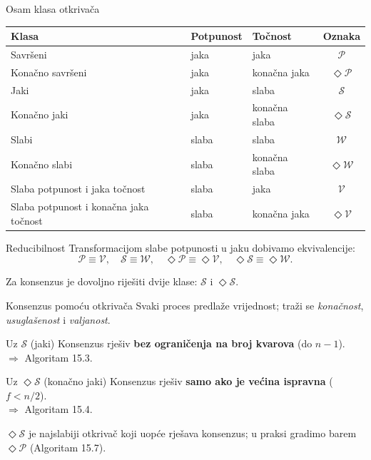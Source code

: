 \documentclass[aspectratio=169,11pt]{beamer}
\newcommand{\Dp}{\ensuremath{\mathcal{P}}}
\newcommand{\Ds}{\ensuremath{\mathcal{S}}}
\newcommand{\Dw}{\ensuremath{\mathcal{W}}}
\newcommand{\Dv}{\ensuremath{\mathcal{V}}}
\newcommand{\eP}{\ensuremath{\Diamond\mathcal{P}}}
\newcommand{\eS}{\ensuremath{\Diamond\mathcal{S}}}
\newcommand{\eW}{\ensuremath{\Diamond\mathcal{W}}}
\newcommand{\eV}{\ensuremath{\Diamond\mathcal{V}}}
\begin{document}
\begin{frame}{Osam klasa otkrivača}
  \centering
  \small
  \begin{tabular}{lllc}
    \toprule
    Klasa & Potpunost & Točnost & Oznaka \\
    \midrule
    Savršeni             & jaka  & jaka          & \Dp \\
    Konačno savršeni     & jaka  & konačna jaka  & \eP \\
    Jaki                 & jaka  & slaba         & \Ds \\
    Konačno jaki         & jaka  & konačna slaba & \eS \\
    Slabi                & slaba & slaba         & \Dw \\
    Konačno slabi        & slaba & konačna slaba & \eW \\
    Slaba potpunost i jaka točnost                  & slaba & jaka          & \Dv \\
    Slaba potpunost i konačna jaka točnost                  & slaba & konačna jaka  & \eV \\
    \bottomrule
  \end{tabular}
\end{frame}

\begin{frame}{Reducibilnost}
  Transformacijom slabe potpunosti u jaku dobivamo ekvivalencije:
  \[
    \Dp \equiv \Dv,\quad \Ds \equiv \Dw,\quad \eP \equiv \eV,\quad \eS \equiv \eW.
  \]
  \vfill
  \centering
  \vfill
  \footnotesize Za konsenzus je dovoljno riješiti dvije klase: \Ds{} i \eS.
\end{frame}

\begin{frame}{Konsenzus pomoću otkrivača}
  Svaki proces predlaže vrijednost; traži se \emph{konačnost}, \emph{usuglašenost}
  i \emph{valjanost}.
  \vfill
  \begin{block}{Uz \Ds{} (jaki)}
    Konsenzus rješiv \textbf{bez ograničenja na broj kvarova} (do $n-1$). \\
    $\Rightarrow$ Algoritam 15.3.
  \end{block}
  \begin{block}{Uz \eS{} (konačno jaki)}
    Konsenzus rješiv \textbf{samo ako je većina ispravna} ($f < n/2$). \\
    $\Rightarrow$ Algoritam 15.4.
  \end{block}
  \vfill
  \footnotesize \eS{} je najslabiji otkrivač koji uopće rješava konsenzus; u praksi
  gradimo barem \eP{} (Algoritam 15.7).
\end{frame}
\end{document}
